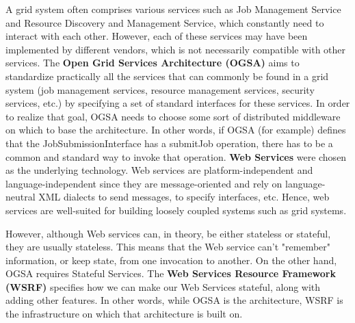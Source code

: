 \documentclass[9pt,twocolumn,twoside]{styles/osajnl}
\begin{document}
A grid system often comprises various services such as Job Management Service and Resource Discovery and Management Service, which constantly need to interact with each other. However, each of these services may have been implemented by different vendors, which is not necessarily compatible with other services. The \textbf{Open Grid Services Architecture (OGSA)} aims to standardize practically all the services that can commonly be found in a
grid system (job management services, resource management services, security services, etc.) by specifying a set of standard interfaces for these services.
In order to realize that goal, OGSA needs to choose some sort of distributed middleware on which to base the architecture. In other words, if OGSA (for example) defines that the JobSubmissionInterface has a submitJob operation, there has to be a common and standard way to invoke that operation. \textbf{Web Services} were chosen as the underlying technology. Web services are platform-independent and language-independent since they are message-oriented and rely on language-neutral XML dialects to send messages, to specify interfaces, etc. Hence, web services are well-suited for building loosely coupled systems such as grid systems.

However, although Web services can, in theory, be either stateless or stateful, they are usually stateless. This means that the Web service can’t "remember" information, or keep state, from one invocation to another. On the other hand, OGSA requires Stateful Services. 
The \textbf{Web Services Resource Framework (WSRF)} specifies how we can make our Web Services stateful, along with adding other features. In other words, while OGSA is the architecture, WSRF is the infrastructure on which that architecture is built on.
\end{document}
